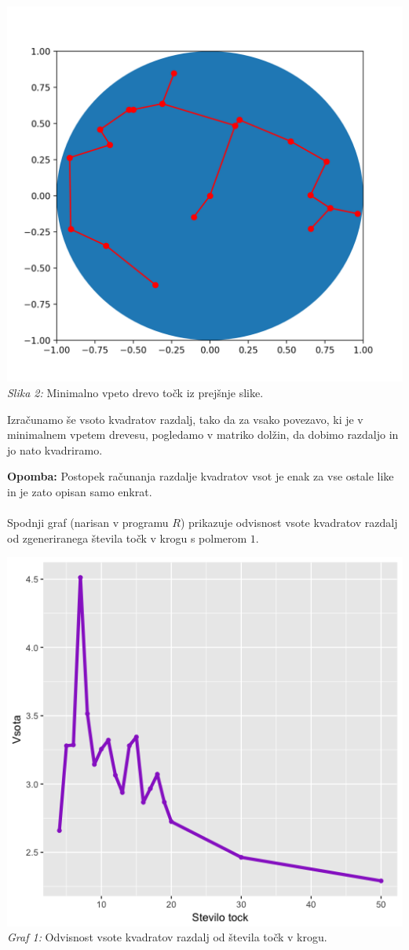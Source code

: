 \documentclass[a4paper]{report}
\begin{document}
\begin{enumerate}
\begin{center}
\includegraphics[scale = 0.3]{slikadrevokrog}\\ 
\scriptsize{\textit{Slika 2: } Minimalno vpeto drevo točk iz prejšnje slike.}
\end{center}
Izračunamo še vsoto kvadratov razdalj, tako da za vsako povezavo, ki je v minimalnem vpetem drevesu, pogledamo v matriko dolžin, da dobimo razdaljo in jo nato kvadriramo.
\end{enumerate} 
\textbf{Opomba: } Postopek računanja razdalje kvadratov vsot je enak za vse ostale like in je zato opisan samo enkrat. \\ \\
Spodnji graf (narisan v programu $R$) prikazuje odvisnost vsote kvadratov razdalj od zgeneriranega števila točk v krogu s polmerom $1$.
\begin{center}
\includegraphics[scale = 0.3]{krog_st_tock}\\ 
\scriptsize{\textit{Graf 1: } Odvisnost vsote kvadratov razdalj od števila točk v krogu.}
\end{center}
\end{document}
